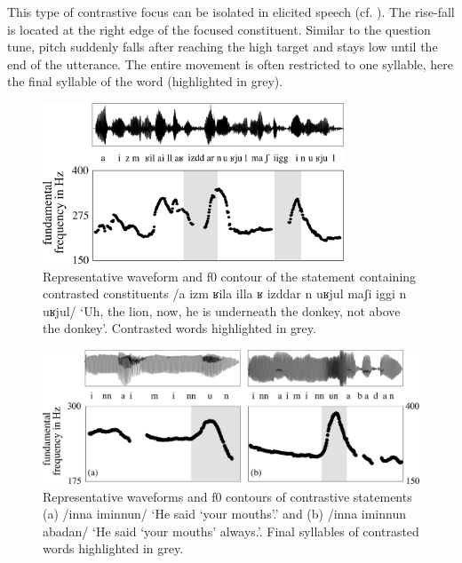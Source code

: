 This type of contrastive focus can be isolated in elicited speech (cf. ). The rise-fall is located at the right edge of the focused constituent. Similar to the question tune, pitch suddenly falls after reaching the high target and stays low until the end of the utterance. The entire movement is often restricted to one syllable, here the final syllable of the word (highlighted in grey).

\begin{figure}
  \centering 
   \includegraphics[width=0.8\textwidth]{figures/Figure_5_3_contrast.png}
  \caption{Representative waveform and f0 contour of the statement containing contrasted constituents /a izm ʁila illa ʁ izddar n uʁjul maʃi iggi n uʁjul/ ‘Uh, the lion, now, he is underneath the donkey, not above the donkey’. Contrasted words highlighted in grey.}
   \label{fig:5.3}
   \end{figure}

  \begin{figure}
  \centering 
   \includegraphics[width=1\textwidth]{figures/Figure_5_4_iminnun.png}
  \caption{Representative waveforms and f0 contours of contrastive statements (a) /inna iminnun/ ‘He said ‘your mouths’.’ and (b) /inna iminnun abadan/ ‘He said ‘your mouths’ always.’. Final syllables of contrasted words highlighted in grey. }
   \label{fig:5.4}
   \end{figure}


